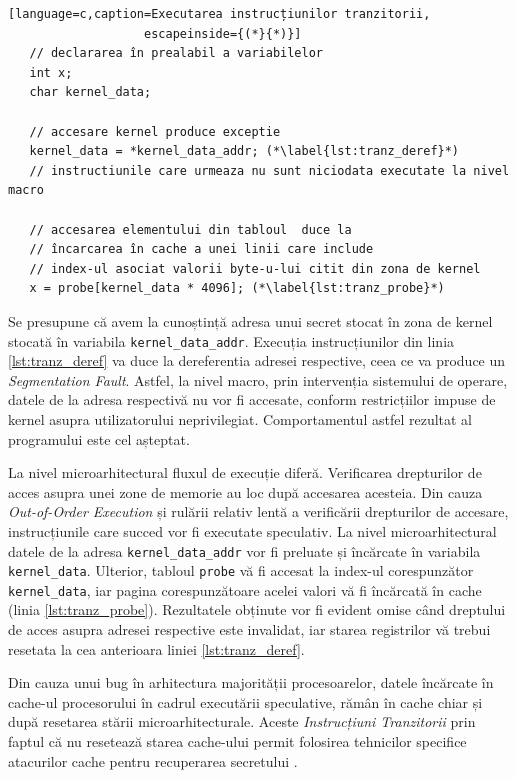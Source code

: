 \begin{lstlisting}[language=c,caption=Executarea instrucțiunilor tranzitorii,
                   escapeinside={(*}{*)}]
   // declararea în prealabil a variabilelor
   int x;
   char kernel_data;

   // accesare kernel produce exceptie
   kernel_data = *kernel_data_addr; (*\label{lst:tranz_deref}*) 
   // instructiunile care urmeaza nu sunt niciodata executate la nivel macro

   // accesarea elementului din tabloul  duce la
   // încarcarea în cache a unei linii care include 
   // index-ul asociat valorii byte-u-lui citit din zona de kernel
   x = probe[kernel_data * 4096]; (*\label{lst:tranz_probe}*)
\end{lstlisting} \label{code:transient}

Se presupune că avem la cunoștință adresa unui secret stocat în zona de kernel
stocată în variabila \texttt{kernel\_data\_addr}. Execuția instrucțiunilor din
linia \ref{lst:tranz_deref} va duce la dereferentia adresei respective, ceea ce va produce un
\emph{Segmentation Fault}. Astfel, la nivel macro, prin intervenția sistemului
de operare, datele de la adresa respectivă nu vor fi accesate, conform
restricțiilor impuse de kernel asupra utilizatorului neprivilegiat.
Comportamentul astfel rezultat al programului este cel așteptat.

La nivel microarhitectural fluxul de execuție diferă. Verificarea drepturilor
de acces asupra unei zone de memorie au loc după accesarea acesteia. Din cauza
\emph{Out-of-Order Execution} și rulării relativ lentă a verificării
drepturilor de accesare, instrucțiunile care succed vor fi executate
speculativ. La nivel microarhitectural datele de la adresa
\texttt{kernel\_data\_addr} vor fi preluate și încărcate în variabila
\texttt{kernel\_data}. Ulterior, tabloul \texttt{probe} vă fi accesat la
index-ul corespunzător \texttt{kernel\_data}, iar pagina corespunzătoare acelei
valori vă fi încărcată în cache (linia \ref{lst:tranz_probe}). Rezultatele obținute vor fi
evident omise când dreptului de acces asupra adresei respective este invalidat,
iar starea registrilor vă trebui resetata la cea anterioara liniei \ref{lst:tranz_deref}. 

Din cauza unui bug în arhitectura majorității procesoarelor, datele încărcate
în cache-ul procesorului în cadrul executării speculative, rămân în cache chiar
și după resetarea stării microarhitecturale. Aceste \emph{Instrucțiuni
Tranzitorii} prin faptul că nu resetează starea cache-ului permit folosirea
tehnicilor specifice atacurilor cache pentru recuperarea secretului
\cite{meltdown2018}.

